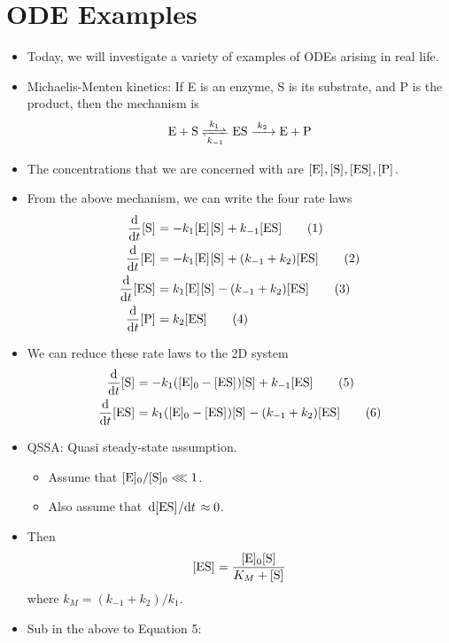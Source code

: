 \documentclass[../notes.tex]{subfiles}
\begin{document}
\section{ODE Examples}
\begin{itemize}
    \item {}Today, we will investigate a variety of examples of ODEs arising in real life.
    \item Michaelis-Menten kinetics: If E is an enzyme, S is its substrate, and P is the product, then the mechanism is
    \begin{equation*}
        \ce{E + S <=>[$k_1$][$k_{-1}$] ES ->[$k_2$] E + P}
    \end{equation*}
    \item The concentrations that we are concerned with are $\cnc{E},\cnc{S},\cnc{ES},\cnc{P}$.
    \item From the above mechanism, we can write the four rate laws
    \begin{align*}
        \dv{t}\cnc{S} &= -k_1\cnc{E}\cnc{S}+k_{-1}\cnc{ES}\tag{1}\\
        \dv{t}\cnc{E} &= -k_1\cnc{E}\cnc{S}+(k_{-1}+k_2)\cnc{ES}\tag{2}\\
        \dv{t}\cnc{ES} &= k_1\cnc{E}\cnc{S}-(k_{-1}+k_2)\cnc{ES}\tag{3}\\
        \dv{t}\cnc{P} &= k_2\cnc{ES}\tag{4}
    \end{align*}
    \item We can reduce these rate laws to the 2D system
    \begin{align*}
        \dv{t}\cnc{S} &= -k_1(\cnc[0]{E}-\cnc{ES})\cnc{S}+k_{-1}\cnc{ES}\tag{5}\\
        \dv{t}\cnc{ES} &= k_1(\cnc[0]{E}-\cnc{ES})\cnc{S}-(k_{-1}+k_2)\cnc{ES}\tag{6}
    \end{align*}
    \item QSSA: Quasi steady-state assumption.
    \begin{itemize}
        \item Assume that $\cnc[0]{E}/\cnc[0]{S}\lll 1$.
        \item Also assume that $\dv*{\cnc{ES}}{t}\approx 0$.
    \end{itemize}
    \item Then
    \begin{equation*}
        \cnc{ES} = \frac{\cnc[0]{E}\cnc{S}}{K_M+\cnc{S}}
    \end{equation*}
    where $k_M=(k_{-1}+k_2)/k_1$.
    \item Sub in the above to Equation 5:

\end{itemize}
\end{document}
